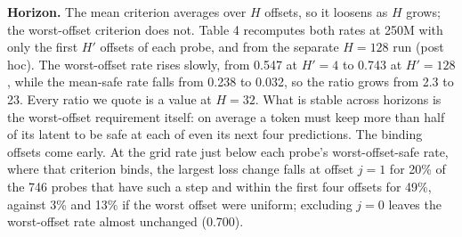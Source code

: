 \documentclass[10pt]{article}
\begin{document}
\begin{table}[t]
\centering
\caption{Mean suffix-safe rate (fraction of $d_c$) under the mean ($k=32$) and worst-offset ($k=1$) criteria at four budgets, recomputed from stored per-offset records on the published grid (smallest rate 0.031). Ratio is max over mean; because most mean-criterion rates sit at the grid floor, each ratio is a lower bound.}
\end{table}

\textbf{Horizon.} The mean criterion averages over $H$ offsets, so it loosens as $H$ grows; the worst-offset criterion does not. Table 4 recomputes both rates at 250M with only the first $H'$ offsets of each probe, and from the separate $H=128$ run (post hoc). The worst-offset rate rises slowly, from 0.547 at $H'=4$ to 0.743 at $H'=128$, while the mean-safe rate falls from 0.238 to 0.032, so the ratio grows from 2.3 to 23. Every ratio we quote is a value at $H=32$. What is stable across horizons is the worst-offset requirement itself: on average a token must keep more than half of its latent to be safe at each of even its next four predictions. The binding offsets come early. At the grid rate just below each probe's worst-offset-safe rate, where that criterion binds, the largest loss change falls at offset $j=1$ for 20\% of the 746 probes that have such a step and within the first four offsets for 49\%, against 3\% and 13\% if the worst offset were uniform; excluding $j=0$ leaves the worst-offset rate almost unchanged (0.700).
\end{document}
